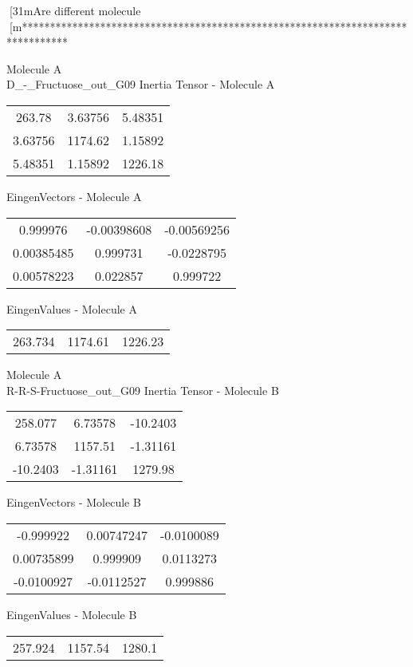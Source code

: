 [31mAre different molecule
[m********************************************************************************
\newpage
\begin{multicols}{2}
\begin{center}
Molecule A \\ 
D_-_Fructuose_out_G09
Inertia Tensor - Molecule A \\
\vtab
\begin{tabular}{|c c c|}
263.78	 & 	3.63756	 & 	5.48351	 \\
3.63756	 & 	1174.62	 & 	1.15892	 \\
5.48351	 & 	1.15892	 & 	1226.18
\end{tabular}

\vtab
 EingenVectors - Molecule A     \\
\vtab
\begin{tabular}{|c c c|}
0.999976	 & 	-0.00398608	 & 	-0.00569256	 \\
0.00385485	 & 	0.999731	 & 	-0.0228795	 \\
0.00578223	 & 	0.022857	 & 	0.999722
\end{tabular}

\vtab
 EingenValues - Molecule A     \\
\vtab
\begin{tabular}{|c c c|}
263.734	 & 	1174.61	 & 	1226.23
\end{tabular}
\columnbreak
Molecule A \\ 
R-R-S-Fructuose_out_G09
Inertia Tensor - Molecule B \\
\vtab
\begin{tabular}{|c c c|}
258.077	 & 	6.73578	 & 	-10.2403	 \\
6.73578	 & 	1157.51	 & 	-1.31161	 \\
-10.2403	 & 	-1.31161	 & 	1279.98
\end{tabular}

\vtab
 EingenVectors - Molecule B     \\
\vtab
\begin{tabular}{|c c c|}
-0.999922	 & 	0.00747247	 & 	-0.0100089	 \\
0.00735899	 & 	0.999909	 & 	0.0113273	 \\
-0.0100927	 & 	-0.0112527	 & 	0.999886
\end{tabular}

\vtab
 EingenValues - Molecule B     \\
\vtab
\begin{tabular}{|c c c|}
257.924	 & 	1157.54	 & 	1280.1
\end{tabular}
\end{center}
\end{multicols}
